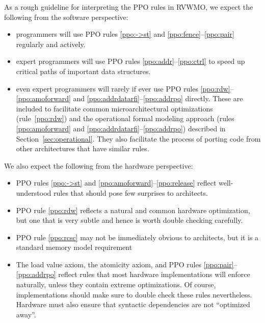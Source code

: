 As a rough guideline for interpreting the PPO rules in RVWMO, we expect the following from the software perspective:
\begin{itemize}
  \item programmers will use PPO rules \ref{ppo:->st} and \ref{ppo:fence}--\ref{ppo:pair} regularly and actively.
  \item expert programmers will use PPO rules \ref{ppo:addr}--\ref{ppo:ctrl} to speed up critical paths of important data structures.
  \item even expert programmers will rarely if ever use PPO rules \ref{ppo:rdw}--\ref{ppo:amoforward} and \ref{ppo:addrdatarfi}--\ref{ppo:addrpo} directly.  These are included to facilitate common microarchitectural optimizations (rule~\ref{ppo:rdw}) and the operational formal modeling approach (rules \ref{ppo:amoforward} and \ref{ppo:addrdatarfi}--\ref{ppo:addrpo}) described in Section~\ref{sec:operational}.  They also facilitate the process of porting code from other architectures that have similar rules.
\end{itemize}

We also expect the following from the hardware perspective:
\begin{itemize}
  \item PPO rules \ref{ppo:->st} and \ref{ppo:amoforward}--\ref{ppo:release} reflect well-understood rules that should pose few surprises to architects.
  \item PPO rule \ref{ppo:rdw} reflects a natural and common hardware optimization, but one that is very subtle and hence is worth double checking carefully.
  \item PPO rule \ref{ppo:rcsc} may not be immediately obvious to architects, but it is a standard memory model requirement
  \item The load value axiom, the atomicity axiom, and PPO rules \ref{ppo:pair}--\ref{ppo:addrpo} reflect rules that most hardware implementations will enforce naturally, unless they contain extreme optimizations.  Of course, implementations should make sure to double check these rules nevertheless.  Hardware must also ensure that syntactic dependencies are not ``optimized away''.
\end{itemize}

